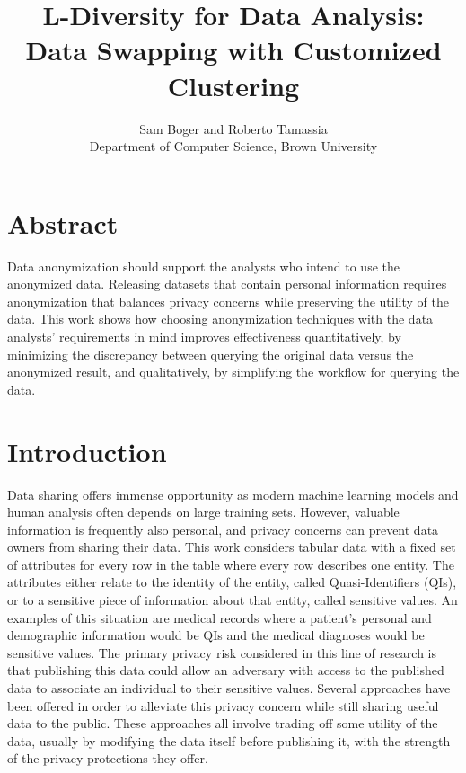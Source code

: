 

\date{}

\title{\Large \bf L-Diversity for Data Analysis:\\
  Data Swapping with Customized Clustering}

\author{
{\rm Sam Boger and Roberto Tamassia} \\
Department of Computer Science, Brown University

} %

\maketitle
\section*{Abstract}
Data anonymization should support the analysts who intend to use the anonymized data. Releasing datasets that contain personal information requires anonymization that balances privacy concerns while preserving the utility of the data. This work shows how choosing anonymization techniques with the data analysts' requirements in mind improves effectiveness quantitatively, by minimizing the discrepancy between querying the original data versus the anonymized result, and qualitatively, by simplifying the workflow for querying the data.

\section{Introduction}
Data sharing offers immense opportunity as modern machine learning models and human analysis often depends on large training sets. However, valuable information is frequently also personal, and privacy concerns can prevent data owners from sharing their data. This work considers tabular data with a fixed set of attributes for every row in the table where every row describes one entity. The attributes either relate to the identity of the entity, called Quasi-Identifiers (QIs), or to a sensitive piece of information about that entity, called sensitive values. An examples of this situation are medical records where a patient's personal and demographic information would be QIs and the medical diagnoses would be sensitive values. The primary privacy risk considered in this line of research is that publishing this data could allow an adversary with access to the published data to associate an individual to their sensitive values. Several approaches have been offered in order to alleviate this privacy concern while still sharing useful data to the public. These approaches all involve trading off some utility of the data, usually by modifying the data itself before publishing it, with the strength of the privacy protections they offer.

